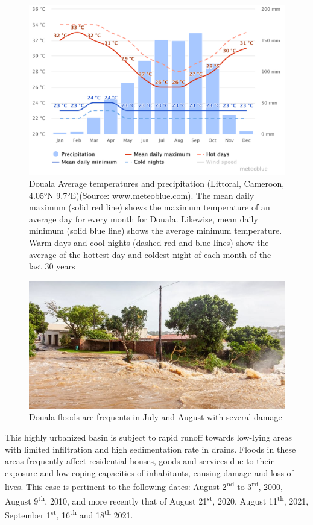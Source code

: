 \begin{figure}[hbt!]
	\centering
	\includegraphics[width=0.5\linewidth]{figure/douala_climate.pdf}
	\caption{Douala Average temperatures and precipitation (Littoral, Cameroon, 4.05°N 9.7°E)(Source: www.meteoblue.com)\cite{meteoblue}. The mean daily maximum (solid red line) shows the maximum temperature of an average day for every month for Douala. Likewise, mean daily minimum (solid blue line) shows the average minimum temperature. Warm days and cool nights (dashed red and blue lines) show the average of the hottest day and coldest night of each month of the last 30 years}
	\label{fig:climateprecipitation}
\end{figure}
\begin{figure}[hbt!]
	\centering
	\includegraphics[width=0.8\linewidth]{figure/douala.jpg}
	\caption{Douala floods are frequents in July and August with several damage\cite{Afrik21}}
	\label{fig:floodimage}
\end{figure}

This highly urbanized basin is subject to rapid runoff towards low-lying areas with limited infiltration and high sedimentation rate in drains. Floods in these areas frequently affect residential houses, goods and services due to their exposure and low coping capacities of inhabitants, causing damage and loss of lives. This case is pertinent to the following dates: August 2\textsuperscript{nd} to 3\textsuperscript{rd}, 2000, August 9\textsuperscript{th}, 2010, and more recently that of August 21\textsuperscript{st}, 2020, August 11\textsuperscript{th}, 2021, September 1\textsuperscript{st}, 16\textsuperscript{th} and 18\textsuperscript{th} 2021.

